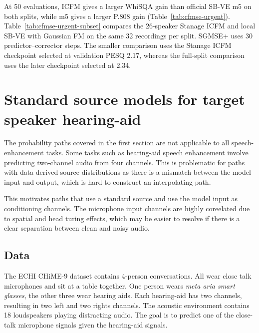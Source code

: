 
At 50 evaluations, \ac{ICFM} gives a larger WhiSQA gain than official \ac{SB-VE} m5 on both splits, while m5 gives a larger P.808 gain (Table~\ref{tab:cfmse-urgent}). Table~\ref{tab:cfmse-urgent-subset} compares the 26-speaker Stanage \ac{ICFM} and local \ac{SB-VE} with Gaussian \ac{FM} on the same 32 recordings per split. SGMSE+ uses 30 predictor--corrector steps. The smaller comparison uses the Stanage \ac{ICFM} checkpoint selected at validation \ac{PESQ} 2.17, whereas the full-split comparison uses the later checkpoint selected at 2.34.

\section{Standard source models for target speaker hearing-aid}


The probability paths covered in the first section are not applicable to all speech-enhancement tasks. Some tasks such as hearing-aid speech enhancement involve predicting two-channel audio from four channels. This is problematic for paths with data-derived source distributions as there is a mismatch between the model input and output, which is hard to construct an interpolating path. 

This motivates paths that use a standard source and use the model input as conditioning channels. The microphone input channels are highly coreelated due to spatial and head turing effects, which may be easier to resolve if there is a clear separation between clean and noisy audio.


\subsection{Data}

The ECHI CHiME-9 dataset contains 4-person conversations. All wear close talk microphones and sit at a table together. One person wears \textit{meta aria smart glasses}, the other three wear hearing aids. Each hearing-aid has two channels, resulting in two left and two rights channels. The acoustic environment contains 18 loudspeakers playing distracting audio. The goal is to predict one of the close-talk microphone signals given the hearing-aid signals.

